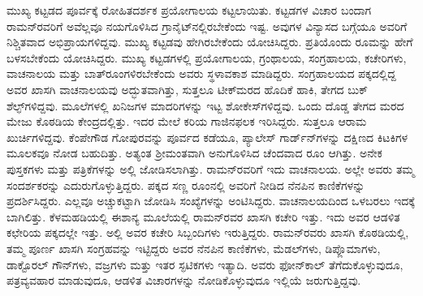 ಮುಖ್ಯ ಕಟ್ಟಡದ ಪೂರ್ವಕ್ಕೆ ರೋಹಿತದರ್ಶಕ ಪ್ರಯೋಗಾಲಯ ಕಟ್ಟಲಾಯಿತು. ಕಟ್ಟಡಗಳ ವಿಚಾರ ಬಂದಾಗ ರಾಮನ್‍ರವರಿಗೆ ಅವೆಲ್ಲವೂ ನಯಗೊಳಿಸಿದ ಗ್ರಾನೈಟ್‍ನಲ್ಲಿರಬೇಕೆಂದು ಇಷ್ಟ. ಅವುಗಳ ವಿನ್ಯಾಸದ ಬಗ್ಗೆಯೂ ಅವರಿಗೆ ನಿಶ್ಚಿತವಾದ ಅಭಿಪ್ರಾಯಗಳಿದ್ದವು. ಮುಖ್ಯ ಕಟ್ಟಡವು ಹೇಗಿರಬೇಕೆಂದು ಯೋಚಿಸಿದ್ದರು. ಪ್ರತಿಯೊಂದು ರೂಮನ್ನು ಹೇಗೆ ಬಳಸಬೇಕೆಂದು ಯೋಚಿಸಿದ್ದರು. ಮುಖ್ಯ ಕಟ್ಟಡಗಳಲ್ಲಿ ಪ್ರಯೋಗಾಲಯ, ಗ್ರಂಥಾಲಯ, ಸಂಗ್ರಹಾಲಯ, ಕಚೇರಿಗಳು, ವಾಚನಾಲಯ ಮತ್ತು ಬಾತ್‍ರೂಂಗಳಿರಬೇಕೆಂದು ಅವರು ಸ್ಥಳಾವಕಾಶ ಮಾಡಿದ್ದರು. ಸಂಗ್ರಹಾಲಯದ ಪಕ್ಕದಲ್ಲಿದ್ದ ಅವರ ಖಾಸಗಿ ವಾಚನಾಲಯವು ಅದ್ಭುತವಾಗಿತ್ತು, ಸುತ್ತಲೂ ಟೀಕ್‍ಮರದ ಹೊದಿಕೆ ಹಾಕಿ, ತೇಗದ ಬುಕ್ ಶೆಲ್ಫ್‌ಗಳಿದ್ದವು. ಮೂಲೆಗಳಲ್ಲಿ ಖನಿಜಗಳ ಮಾದರಿಗಳನ್ನು ಇಟ್ಟ ಶೋಕೇಸ್‍ಗಳಿದ್ದವು. ಒಂದು ದೊಡ್ಡ ತೇಗದ ಮರದ ಮೇಜು ಕೊಠಡಿಯ ಕೇಂದ್ರದಲ್ಲಿತ್ತು. ಇದರ ಮೇಲೆ ಕರಿಯ ಗಾಜಿನಫಲಕ ಇರಿಸಿದ್ದರು. ಸುತ್ತಲೂ ಆರಾಮ ಖುರ್ಚಿಗಳಿದ್ದವು. ಕೆಂಪೇಗೌಡ ಗೋಪುರವನ್ನು ಪೂರ್ವದ ಕಡೆಯೂ, ಪ್ಯಾಲೇಸ್ ಗಾರ್ಡ್‌ನ್‍ಗಳನ್ನು ದಕ್ಷಿಣದ ಕಿಟಕಿಗಳ ಮೂಲಕವೂ ನೋಡ ಬಹುದಿತ್ತು. ಅತ್ಯಂತ ಶ‍್ರೀಮಂತವಾಗಿ ಅನುಗೊಳಿಸಿದ ಚೆಂದವಾದ ರೂಂ ಆಗಿತ್ತು. ಅನೇಕ ಪುಸ್ತಕಗಳು ಮತ್ತು ಪತ್ರಿಕೆಗಳನ್ನು ಅಲ್ಲಿ ಜೋಡಿಸಲಾಗಿತ್ತು. ರಾಮನ್‍ರವರಿಗೆ ಇದು ವಾಚನಾಲಯ. ಅಲ್ಲೇ ಅವರು ತಮ್ಮ ಸಂದರ್ಶಕರನ್ನು ಎದುರುಗೊಳ್ಳುತ್ತಿದ್ದರು. ಪಕ್ಕದ ಸಣ್ಣ ರೂಂನಲ್ಲಿ ಅವರಿಗೆ ನೀಡಿದ ನೆನಪಿನ ಕಾಣಿಕೆಗಳನ್ನು ಪ್ರದರ್ಶಿಸಿದ್ದರು. ಎಲ್ಲವೂ ಅಚ್ಚುಕಟ್ಟಾಗಿ ಜೋಡಿಸಿ ಸಂಖ್ಯೆಗಳನ್ನು ಅಂಟಿಸಿದ್ದರು. ವಾಚನಾಲಯದಿಂದ ಒಳಬರಲು ಇದಕ್ಕೆ ಬಾಗಿಲಿತ್ತು. ಕೆಳಮಹಡಿಯಲ್ಲಿ ಈಶಾನ್ಯ ಮೂಲೆಯಲ್ಲಿ ರಾಮನ್‍ರವರ ಖಾಸಗಿ ಕಚೇರಿ ಇತ್ತು. ಇದು ಅವರ ಆಡಳಿತ ಕಛೇರಿಯ ಪಕ್ಕದಲ್ಲೇ ಇತ್ತು. ಅಲ್ಲಿ ಅವರ ಕಚೇರಿ ಸಿಬ್ಬಂದಿಗಳು ಇರುತ್ತಿದ್ದರು. ರಾಮನ್‍ರವರು ಖಾಸಗಿ ಕೊಠಡಿಯಲ್ಲಿ, ತಮ್ಮ ಪೂರ್ಣ ಖಾಸಗಿ ಸಂಗ್ರಹವನ್ನು ಇಟ್ಟಿದ್ದರು \enginline{-} ಅವರ ನೆನಪಿನ ಕಾಣಿಕೆಗಳು, ಮೆಡಲ್‍ಗಳು, ಡಿಪ್ಲೊಮಾಗಳು, ಡಾಕ್ಟೊರಲ್ ಗೌನ್‍ಗಳು, ವಜ್ರಗಳು ಮತ್ತು ಇತರ ಸ್ಫಟಿಕಗಳು ಇತ್ಯಾದಿ. ಅವರು ಫೋನ್‍ಕಾಲ್ ತೆಗೆದುಕೊಳ್ಳುವುದೂ, ಪತ್ರವ್ಯವಹಾರ ಮಾಡುವುದೂ, ಆಡಳಿತ ವಿಚಾರಗಳನ್ನು ನೋಡಿಕೊಳ್ಳುವುದೂ ಇಲ್ಲಿಯೆ ಜರುಗುತ್ತಿದ್ದವು.

